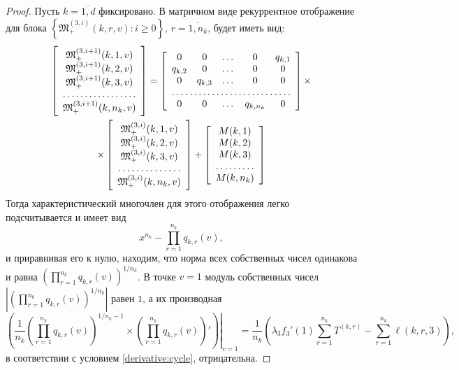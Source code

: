 \documentclass[a4paper,12pt,russian]{extarticle}
\begin{document}
\begin{proof}
Пусть $k =\overline{1,d}$ фиксировано. В матричном виде рекуррентное отображение для блока $\left\{\mathfrak{M}_+^{(3,i)}(k,r,v)\colon i \geqslant 0\right\}$, $r =\overline{1,n_k}$, будет иметь вид:
\begin{multline*}
\left[ \begin{array}{c}
    \mathfrak{M}_+^{(3,i+1)}(k,1,v) \\
    \mathfrak{M}_+^{(3,i+1)}(k,2,v) \\
    \mathfrak{M}_+^{(3,i+1)}(k,3,v) \\
    \hdotsfor{1} \\
    \mathfrak{M}_+^{(3,i+1)}(k,n_k,v)
\end{array}\right]
=
\left[ \begin{array}{c c c c c c}
    0       & 0  & \dots & 0 &   q_{k,1} \\
    q_{k,2}       & 0  & \dots & 0 & 0 \\
    0       & q_{k,3}  & \dots  &0  & 0 \\
    \hdotsfor{5} \\
    0       & 0  & \dots &  q_{k,n_k} & 0 \\
\end{array}\right]
\times \\ \times
\left[ \begin{array}{c}
    \mathfrak{M}_+^{(3,i)}(k,1,v) \\
    \mathfrak{M}_+^{(3,i)}(k,2,v) \\
    \mathfrak{M}_+^{(3,i)}(k,3,v) \\
    \hdotsfor{1} \\
    \mathfrak{M}_+^{(3,i)}(k,n_k,v)\\
\end{array}\right]
+
\left[ \begin{array}{c}
    M(k,1) \\
    M(k,2) \\
    M(k,3) \\
    \hdotsfor{1} \\
    M(k,n_k) \\
\end{array}\right]
\end{multline*}
Тогда характеристический многочлен для этого отображения легко подсчитывается и имеет вид 
$$
x^{n_k} - \prod_{r=1}^{n_k}q_{k,r} (v),
$$
и приравнивая его к нулю, находим, что норма всех собственных чисел одинакова и равна $\left(\prod_{r=1}^{n_k}q_{k,r} (v)\right)^{1/n_k}$. В точке $v=1$ модуль собственных чисел $|\left(\prod_{r=1}^{n_k}q_{k,r} (v)\right)^{1/n_k}|$ равен $1$, а их производная
\begin{equation*}
\left(\frac{1}{n_k} \left.\left(\prod_{r=1}^{n_k}q_{k,r} (v)\right)^{1/n_k - 1} \times \left(\prod_{r=1}^{n_k}q_{k,r}(v)\right) '  \right)\right|_{v=1}=\frac{1}{n_k} \left(\lambda_3 f_3'(1) \sum_{r=1}^{n_k} T^{(k,r)} -\sum_{r=1}^{n_k} \ell(k,r,3)\right),
\end{equation*}
в соответствии с условием \eqref{derivative:cycle}, отрицательна.


\end{proof}
\end{document}
